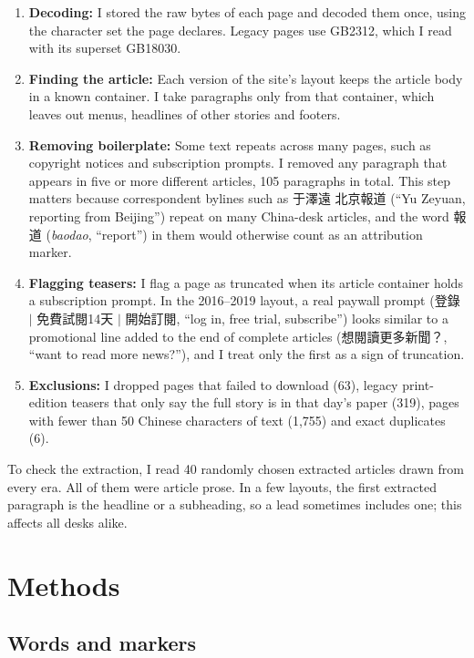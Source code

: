 \documentclass[11pt]{article}
\begin{document}
\begin{enumerate}
\item \textbf{Decoding:} I stored the raw bytes of each page and decoded them once, using the character set the page declares. Legacy pages use GB2312, which I read with its superset GB18030.
\item \textbf{Finding the article:} Each version of the site's layout keeps the article body in a known container. I take paragraphs only from that container, which leaves out menus, headlines of other stories and footers.
\item \textbf{Removing boilerplate:} Some text repeats across many pages, such as copyright notices and subscription prompts. I removed any paragraph that appears in five or more different articles, 105 paragraphs in total. This step matters because correspondent bylines such as 于澤遠 北京報道 (``Yu Zeyuan, reporting from Beijing'') repeat on many China-desk articles, and the word 報道 (\textit{baodao}, ``report'') in them would otherwise count as an attribution marker.
\item \textbf{Flagging teasers:} I flag a page as truncated when its article container holds a subscription prompt. In the 2016--2019 layout, a real paywall prompt (登錄 $|$ 免費試閱14天 $|$ 開始訂閱, ``log in, free trial, subscribe'') looks similar to a promotional line added to the end of complete articles (想閱讀更多新聞？, ``want to read more news?''), and I treat only the first as a sign of truncation.
\item \textbf{Exclusions:} I dropped pages that failed to download (63), legacy print-edition teasers that only say the full story is in that day's paper (319), pages with fewer than 50 Chinese characters of text (1,755) and exact duplicates (6).
\end{enumerate}

\noindent To check the extraction, I read 40 randomly chosen extracted articles drawn from every era. All of them were article prose. In a few layouts, the first extracted paragraph is the headline or a subheading, so a lead sometimes includes one; this affects all desks alike.

\section{Methods}

\subsection{Words and markers}
\end{document}
